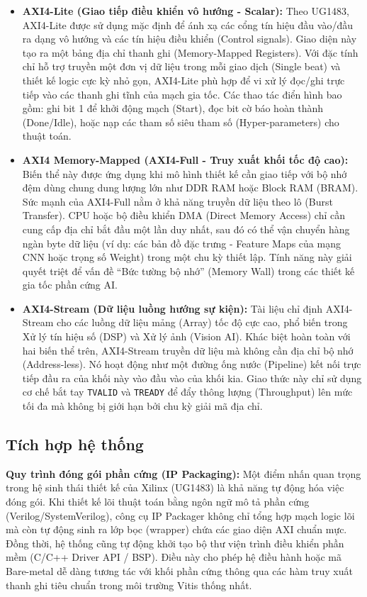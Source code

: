 \begin{itemize}
    \item \textbf{AXI4-Lite (Giao tiếp điều khiển vô hướng - Scalar):} 
    Theo UG1483, AXI4-Lite được sử dụng mặc định để ánh xạ các cổng tín hiệu đầu vào/đầu ra dạng vô hướng và các tín hiệu điều khiển (Control signals). Giao diện này tạo ra một bảng địa chỉ thanh ghi (Memory-Mapped Registers). Với đặc tính chỉ hỗ trợ truyền một đơn vị dữ liệu trong mỗi giao dịch (Single beat) và thiết kế logic cực kỳ nhỏ gọn, AXI4-Lite phù hợp để vi xử lý đọc/ghi trực tiếp vào các thanh ghi tĩnh của mạch gia tốc. Các thao tác điển hình bao gồm: ghi bit 1 để khởi động mạch (Start), đọc bit cờ báo hoàn thành (Done/Idle), hoặc nạp các tham số siêu tham số (Hyper-parameters) cho thuật toán.

    \item \textbf{AXI4 Memory-Mapped (AXI4-Full - Truy xuất khối tốc độ cao):} 
    Biến thể này được ứng dụng khi mô hình thiết kế cần giao tiếp với bộ nhớ đệm dùng chung dung lượng lớn như DDR RAM hoặc Block RAM (BRAM). Sức mạnh của AXI4-Full nằm ở khả năng truyền dữ liệu theo lô (Burst Transfer). CPU hoặc bộ điều khiển DMA (Direct Memory Access) chỉ cần cung cấp địa chỉ bắt đầu một lần duy nhất, sau đó có thể vận chuyển hàng ngàn byte dữ liệu (ví dụ: các bản đồ đặc trưng - Feature Maps của mạng CNN hoặc trọng số Weight) trong một chu kỳ thiết lập. Tính năng này giải quyết triệt để vấn đề ``Bức tường bộ nhớ'' (Memory Wall) trong các thiết kế gia tốc phần cứng AI.

    \item \textbf{AXI4-Stream (Dữ liệu luồng hướng sự kiện):} 
    Tài liệu chỉ định AXI4-Stream cho các luồng dữ liệu mảng (Array) tốc độ cực cao, phổ biến trong Xử lý tín hiệu số (DSP) và Xử lý ảnh (Vision AI). Khác biệt hoàn toàn với hai biến thể trên, AXI4-Stream truyền dữ liệu mà không cần địa chỉ bộ nhớ (Address-less). Nó hoạt động như một đường ống nước (Pipeline) kết nối trực tiếp đầu ra của khối này vào đầu vào của khối kia. Giao thức này chỉ sử dụng cơ chế bắt tay \texttt{TVALID} và \texttt{TREADY} để đẩy thông lượng (Throughput) lên mức tối đa mà không bị giới hạn bởi chu kỳ giải mã địa chỉ.
\end{itemize}

\subsection{Tích hợp hệ thống}

\textbf{Quy trình đóng gói phần cứng (IP Packaging):}
Một điểm nhấn quan trọng trong hệ sinh thái thiết kế của Xilinx (UG1483) là khả năng tự động hóa việc đóng gói. Khi thiết kế lõi thuật toán bằng ngôn ngữ mô tả phần cứng (Verilog/SystemVerilog), công cụ IP Packager không chỉ tổng hợp mạch logic lõi mà còn tự động sinh ra lớp bọc (wrapper) chứa các giao diện AXI chuẩn mực. Đồng thời, hệ thống cũng tự động khởi tạo bộ thư viện trình điều khiển phần mềm (C/C++ Driver API / BSP). Điều này cho phép hệ điều hành hoặc mã Bare-metal dễ dàng tương tác với khối phần cứng thông qua các hàm truy xuất thanh ghi tiêu chuẩn trong môi trường Vitis thống nhất.

